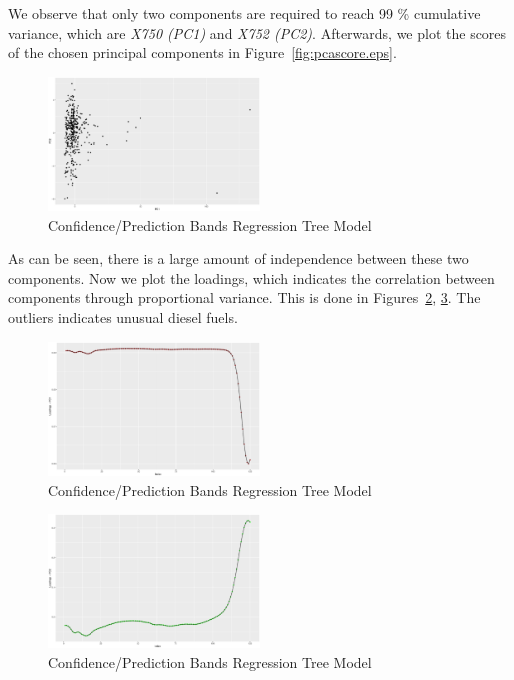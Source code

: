 \documentclass[a4paper, twocolumn]{article}
\begin{document}
        We observe that only two components are required to reach 99 \% cumulative variance, which are \emph{X750 (PC1)} and \emph{X752 (PC2)}. Afterwards, we plot the scores of the chosen principal components in Figure~\ref{fig:pcascore.eps}.

        \begin{figure}[h!]
            \centering
            \caption{Confidence/Prediction Bands Regression Tree Model}
            \label{fig:pcascore}
            \includegraphics[width=0.5\textwidth]{share/A2_pcascore.eps}
        \end{figure}

        As can be seen, there is a large amount of independence between these two components. Now we plot the loadings, which indicates the correlation between components through proportional variance. This is done in Figures~\ref{fig:x750tp}, \ref{fig:x752tp}. The outliers indicates unusual diesel fuels.

        \begin{figure}[h!]
            \centering
            \caption{Confidence/Prediction Bands Regression Tree Model}
            \label{fig:x750tp}
            \includegraphics[width=0.5\textwidth]{share/A2_trace_PC1.eps}
        \end{figure}

        \begin{figure}[h!]
            \centering
            \caption{Confidence/Prediction Bands Regression Tree Model}
            \label{fig:x752tp}
            \includegraphics[width=0.5\textwidth]{share/A2_trace_PC2.eps}
        \end{figure}
\end{document}
